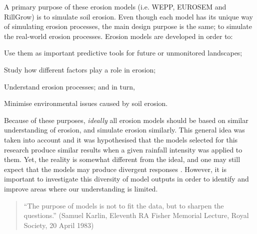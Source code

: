 A primary purpose of these erosion models (i.e. WEPP, EUROSEM and RillGrow) is
to simulate soil erosion.
Even though each model has its unique way of simulating erosion
processes, the main design purpose is the same; to simulate the real-world
erosion processes. Erosion models are developed in order to:
\begin{itemize*}
  \item Use them as important predictive tools for future or unmonitored
landscapes;
  \item Study how different factors play a role in erosion;
  \item Understand erosion processes; and in turn,
  \item Minimise environmental issues caused by soil erosion.
\end{itemize*}
Because of these purposes, \emph{ideally} all erosion models should be based on
similar understanding of erosion, and simulate erosion similarly. %
This general idea was taken into account and it was hypothesised that the
models selected for this research produce similar results when a given
rainfall intensity was applied to them.
Yet, the reality is somewhat different from the ideal, and one may still expect
that the models may produce divergent responses
\citep{favis-mortlock1998-141,jetten1999-521}. However, it is important to
investigate this diversity of model outputs in order to identify and improve
areas where our understanding is limited.

\begin{quotation}
\small ``The purpose of models is not to fit the data, but to sharpen the
questions.'' (Samuel Karlin, Eleventh RA Fisher Memorial Lecture, Royal Society,
20 April 1983)
\end{quotation}

